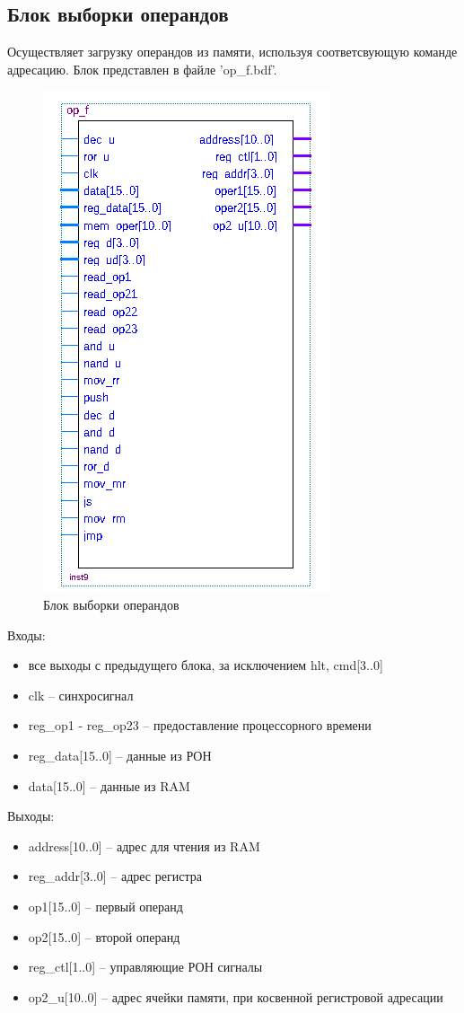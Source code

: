 \subsection{Блок выборки операндов}
Осуществляет загрузку операндов из памяти, используя соответсвующую команде адресацию. Блок представлен в файле 'op\_f.bdf'.

\begin{figure}[ht]{\textwidth}
\centering
    \includegraphics[scale=0.8]{opfb}
    \caption{Блок выборки операндов}
\end{figure}

Входы:
\begin{itemize}
    \item все выходы с предыдущего блока, за исключением hlt, cmd[3..0]
    \item clk -- синхросигнал
    \item reg\_op1 - reg\_op23 -- предоставление процессорного времени
    \item reg\_data[15..0] -- данные из РОН
    \item data[15..0] -- данные из RAM
\end{itemize}
Выходы:
\begin{itemize}
    \item address[10..0] -- адрес для чтения из RAM
    \item reg\_addr[3..0] -- адрес регистра
    \item op1[15..0] -- первый операнд
    \item op2[15..0] -- второй операнд
    \item reg\_ctl[1..0] -- управляющие РОН сигналы
    \item op2\_u[10..0] -- адрес ячейки памяти, при косвенной регистровой адресации
\end{itemize}

